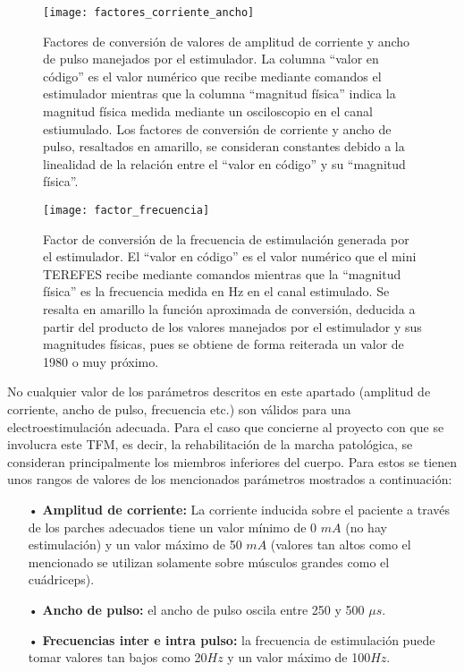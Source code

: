 \begin{figure}[!htb]
\centering
\texttt{[image: factores\_corriente\_ancho]}
  \caption{Factores de conversión de valores de amplitud de corriente y ancho de pulso manejados por el estimulador. La columna ``valor en código'' es el valor numérico que recibe mediante comandos el estimulador mientras que la columna ``magnitud física'' indica la magnitud física medida mediante un osciloscopio en el canal estiumulado. Los factores de conversión de corriente y ancho de pulso, resaltados en amarillo, se consideran constantes debido a la linealidad de la relación entre el ``valor en código'' y su ``magnitud física''.}\label{fig:factores_corriente_ancho}
\end{figure}

\begin{figure}[!htb]
\centering
\texttt{[image: factor\_frecuencia]}
  \caption{Factor de conversión de la frecuencia de estimulación generada por el estimulador. El ``valor en código'' es el valor numérico que el mini TEREFES recibe mediante comandos mientras que la ``magnitud física'' es la frecuencia medida en Hz en el canal estimulado. Se resalta en amarillo la función aproximada de conversión, deducida a partir del producto de los valores manejados por el estimulador y sus magnitudes físicas, pues se obtiene de forma reiterada un valor de 1980 o muy próximo.}\label{fig:factor_frecuencia}
\end{figure}

No cualquier valor de los parámetros descritos en este apartado (amplitud de corriente, ancho de pulso, frecuencia etc.) son válidos para una electroestimulación adecuada. Para el caso que concierne al proyecto con que se involucra este TFM, es decir, la rehabilitación de la marcha patológica, se consideran principalmente los miembros inferiores del cuerpo. Para estos se tienen unos rangos de valores de los mencionados parámetros mostrados a continuación:

\begin{itemize}
\item[•] \textbf{Amplitud de corriente:} La corriente inducida sobre el paciente a través de los parches adecuados tiene un valor mínimo de 0 $mA$ (no hay estimulación) y un valor máximo de 50 $mA$ (valores tan altos como el mencionado se utilizan solamente sobre músculos grandes como el cuádriceps).
\item[•] \textbf{Ancho de pulso:} el ancho de pulso oscila entre 250 y 500 $\mu s$.
\item[•] \textbf{Frecuencias inter e intra pulso:} la frecuencia de estimulación puede tomar valores tan bajos como 20$Hz$ y un valor máximo de 100$Hz$.
\end{itemize} 

